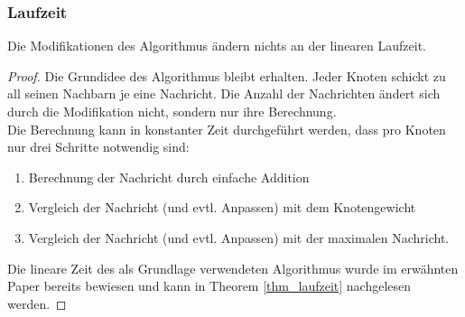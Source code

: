 \subsubsection{Laufzeit}
	
	\begin{theorem}\label{thm_laufzeit_modifikation}
		Die Modifikationen des Algorithmus ändern nichts an der linearen Laufzeit.
	\end{theorem}
	\begin{proof}
		Die Grundidee des Algorithmus bleibt erhalten. Jeder Knoten schickt zu all seinen Nachbarn je eine Nachricht. Die Anzahl der Nachrichten ändert sich durch die Modifikation nicht, sondern nur ihre Berechnung.\\Die Berechnung kann in konstanter Zeit durchgeführt werden, dass pro Knoten nur drei Schritte notwendig sind:
		\begin{enumerate}
			\item Berechnung der Nachricht durch einfache Addition
			\item Vergleich der Nachricht (und evtl. Anpassen) mit dem Knotengewicht
			\item Vergleich der Nachricht (und evtl. Anpassen) mit der maximalen Nachricht.
		\end{enumerate}
		Die lineare Zeit des als Grundlage verwendeten Algorithmus wurde im erwähnten Paper \cite{cima_paper} bereits bewiesen und kann in Theorem \ref{thm_laufzeit} nachgelesen werden.
	\end{proof}



